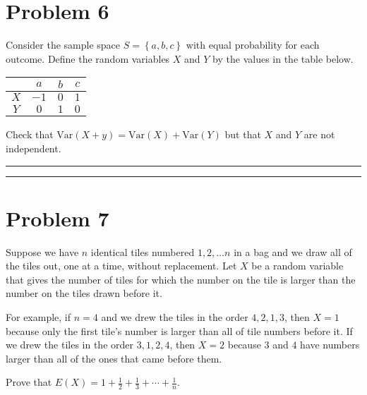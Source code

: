 \documentclass{article}
\theoremstyle{definition}
\newenvironment{solution}{\bigskip\hrule{\hfill}}{\bigskip\hrule{\hfill}} %
\newcommand{\Var}{\text{Var}}
\begin{document}
\section*{Problem 6}

Consider the sample space $S=\left\{a,b,c\right\}$ with equal probability for each outcome. Define the random variables $X$ and $Y$ by the values in the table below. 
\begin{center}
    \begin{tabular}{c|ccc}
            & $ a$ & $b$ & $c$ \\\hline
        $X$ & $-1$ & $0$ & $1$ \\
        $Y$ & $ 0$ & $1$ & $0$ \\
    \end{tabular}
\end{center}
Check that $\Var\left(X+y\right)=\Var\left(X\right)+\Var\left(Y\right)$ but that $X$ and $Y$ are not independent.
\begin{solution}


\end{solution}


\newpage


\section*{Problem 7}

Suppose we have $n$ identical tiles numbered $1,2,\dots n$ in a bag and we draw all of the tiles out, one at a time, without replacement. Let $X$ be a random variable that gives the number of tiles for which the number on the tile is larger than the number on the tiles drawn before it. \medskip

For example, if $n=4$ and we drew the tiles in the order $4,2,1,3$, then $X=1$ because only the first tile's number is larger than all of tile numbers before it. If we drew the tiles in the order $3,1,2,4$, then $X=2$ because $3$ and $4$ have numbers larger than all of the ones that came before them. \medskip

Prove that $E\left(X\right)=1+\frac{1}{2}+\frac{1}{3}+\cdots+\frac{1}{n}$. \medskip
\end{document}
